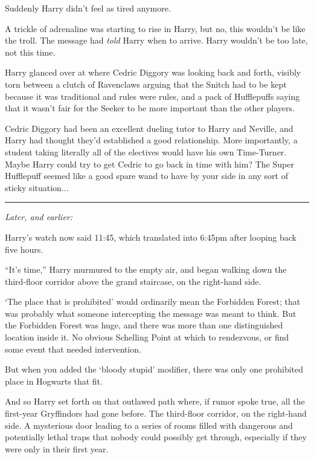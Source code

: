 Suddenly Harry didn't feel as tired anymore.

A trickle of adrenaline was starting to rise in Harry, but no, this wouldn't be like the troll. The message had \emph{told} Harry when to arrive. Harry wouldn't be too late, not this time.

Harry glanced over at where Cedric Diggory was looking back and forth, visibly torn between a clutch of Ravenclaws arguing that the Snitch had to be kept because it was traditional and rules were rules, and a pack of Hufflepuffs saying that it wasn't fair for the Seeker to be more important than the other players.

Cedric Diggory had been an excellent dueling tutor to Harry and Neville, and Harry had thought they'd established a good relationship. More importantly, a student taking literally all of the electives would have his own Time-Turner. Maybe Harry could try to get Cedric to go back in time with him? The Super Hufflepuff seemed like a good spare wand to have by your side in any sort of sticky situation...

\begin{center}\rule{3in}{0.4pt}\end{center}

\emph{Later, and earlier:}

Harry's watch now said 11:45, which translated into 6:45pm after looping back five hours.

``It's time,'' Harry murmured to the empty air, and began walking down the third-floor corridor above the grand staircase, on the right-hand side.

`The place that is prohibited' would ordinarily mean the Forbidden Forest; that was probably what someone intercepting the message was meant to think. But the Forbidden Forest was huge, and there was more than one distinguished location inside it. No obvious Schelling Point at which to rendezvous, or find some event that needed intervention.

But when you added the `bloody stupid' modifier, there was only one prohibited place in Hogwarts that fit.

And so Harry set forth on that outlawed path where, if rumor spoke true, all the first-year Gryffindors had gone before. The third-floor corridor, on the right-hand side. A mysterious door leading to a series of rooms filled with dangerous and potentially lethal traps that nobody could possibly get through, especially if they were only in their first year.

